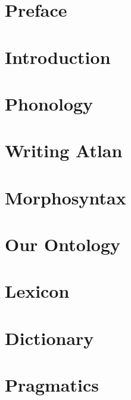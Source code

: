 \documentclass[twoside, openany, 12pt, a5paper]{book}
\begin{document}
\frontmatter


\chapter{Preface}




\mainmatter

\chapter{Introduction}

\chapter{Phonology}

\chapter{Writing Atlan}

\chapter{Morphosyntax}

\chapter{Our Ontology}

\chapter{Lexicon}

\chapter{Dictionary}

\chapter{Pragmatics}
\end{document}

